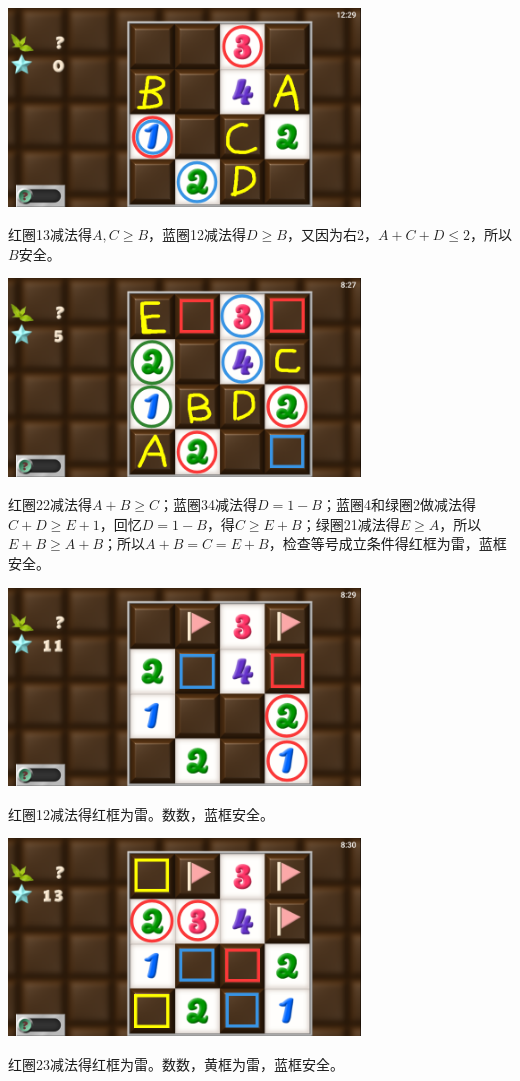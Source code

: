 \subsection{} %
\begin{center}
    \includegraphics[width=0.7\textwidth]{puzzle/173-1.png}
\end{center}
红圈13减法得$A,C\ge B$，蓝圈12减法得$D\ge B$，又因为右2，$A+C+D\le 2$，所以$B$安全。
\begin{center}
    \includegraphics[width=0.7\textwidth]{puzzle/173-2.png}
\end{center}
红圈22减法得$A+B\ge C$；蓝圈34减法得$D=1-B$；蓝圈4和绿圈2做减法得$C+D\ge E+1$，回忆$D=1-B$，得$C\ge E+B$；绿圈21减法得$E\ge A$，所以$E+B\ge A+B$；所以$A+B=C=E+B$，检查等号成立条件得红框为雷，蓝框安全。
\begin{center}
    \includegraphics[width=0.7\textwidth]{puzzle/173-3.png}
\end{center}
红圈12减法得红框为雷。数数，蓝框安全。
\begin{center}
    \includegraphics[width=0.7\textwidth]{puzzle/173-4.png}
\end{center}
红圈23减法得红框为雷。数数，黄框为雷，蓝框安全。